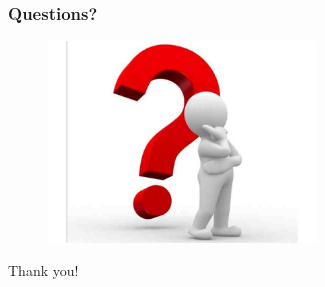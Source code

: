 \documentclass[10pt,xcolor=table]{beamer}
\begin{document}
\begin{frame}\frametitle{Questions?}
	\begin{figure}[t]
		\centering
		\includegraphics[width=2.8in]{questions}
	\end{figure}
	\centering
	\color{blue}
	\Huge{Thank you!}
\end{frame}
\end{document}
